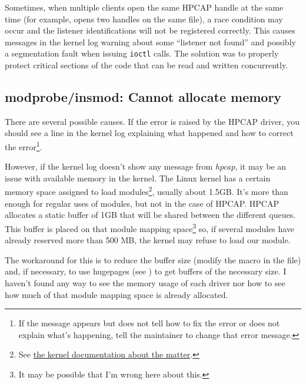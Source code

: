 \begin{bugdata}
\end{bugdata}

Sometimes, when multiple clients open the same HPCAP handle at the same time (for example,  opens two handles on the same file), a race condition may occur and the listener identifications will not be registered correctly. This causes messages in the kernel log warning about some ``listener not found'' and possibly a segmentation fault when issuing \texttt{ioctl} calls. The solution was to properly protect critical sections of the code that can be read and written concurrently.

\subsection{modprobe/insmod: Cannot allocate memory}

\begin{bugdata}
\bugnotfixed
{}
\end{bugdata}

There are several possible causes. If the error is raised by the HPCAP driver, you should see a line in the kernel log explaining what happened and how to correct the error\footnote{If the message appears but does not tell how to fix the error or does not explain what's happening, tell the maintainer to change that error message.}.

However, if the kernel log doesn't show any message from \textit{hpcap}, it may be an issue with available memory in the kernel. The Linux kernel has a certain memory space assigned to load modules\footnote{See \href{https://www.kernel.org/doc/Documentation/x86/x86_64/mm.txt}{the kernel documentation about the matter}.}, usually about 1.5GB. It's more than enough for regular uses of modules, but not in the case of HPCAP. HPCAP allocates a static buffer of 1GB that will be shared between the different queues. This buffer is placed on that module mapping space\footnote{It may be possible that I'm wrong here about this.} so, if several modules have already reserved more than 500 MB, the kernel may refuse to load our module.

The workaround for this is to reduce the buffer size (modify the macro  in the  file) and, if necessary, to use hugepages (see ) to get buffers of the necessary size. I haven't found any way to see the memory usage of each driver nor how to see how much of that module mapping space is already allocated.

